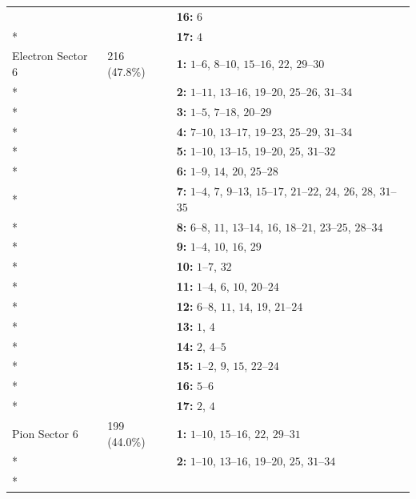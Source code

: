 \begin{longtable}{p{3.5cm}p{2.2cm}p{8.3cm}}
 &  & \textbf{16:} \mbox{$6$} \\*
 &  & \textbf{17:} \mbox{$4$} \\
\addlinespace
Electron Sector 6 & 216 (47.8\%) & \textbf{1:} \mbox{$1$--$6$}, \mbox{$8$--$10$}, \mbox{$15$--$16$}, \mbox{$22$}, \mbox{$29$--$30$} \\*
 &  & \textbf{2:} \mbox{$1$--$11$}, \mbox{$13$--$16$}, \mbox{$19$--$20$}, \mbox{$25$--$26$}, \mbox{$31$--$34$} \\*
 &  & \textbf{3:} \mbox{$1$--$5$}, \mbox{$7$--$18$}, \mbox{$20$--$29$} \\*
 &  & \textbf{4:} \mbox{$7$--$10$}, \mbox{$13$--$17$}, \mbox{$19$--$23$}, \mbox{$25$--$29$}, \mbox{$31$--$34$} \\*
 &  & \textbf{5:} \mbox{$1$--$10$}, \mbox{$13$--$15$}, \mbox{$19$--$20$}, \mbox{$25$}, \mbox{$31$--$32$} \\*
 &  & \textbf{6:} \mbox{$1$--$9$}, \mbox{$14$}, \mbox{$20$}, \mbox{$25$--$28$} \\*
 &  & \textbf{7:} \mbox{$1$--$4$}, \mbox{$7$}, \mbox{$9$--$13$}, \mbox{$15$--$17$}, \mbox{$21$--$22$}, \mbox{$24$}, \mbox{$26$}, \mbox{$28$}, \mbox{$31$--$35$} \\*
 &  & \textbf{8:} \mbox{$6$--$8$}, \mbox{$11$}, \mbox{$13$--$14$}, \mbox{$16$}, \mbox{$18$--$21$}, \mbox{$23$--$25$}, \mbox{$28$--$34$} \\*
 &  & \textbf{9:} \mbox{$1$--$4$}, \mbox{$10$}, \mbox{$16$}, \mbox{$29$} \\*
 &  & \textbf{10:} \mbox{$1$--$7$}, \mbox{$32$} \\*
 &  & \textbf{11:} \mbox{$1$--$4$}, \mbox{$6$}, \mbox{$10$}, \mbox{$20$--$24$} \\*
 &  & \textbf{12:} \mbox{$6$--$8$}, \mbox{$11$}, \mbox{$14$}, \mbox{$19$}, \mbox{$21$--$24$} \\*
 &  & \textbf{13:} \mbox{$1$}, \mbox{$4$} \\*
 &  & \textbf{14:} \mbox{$2$}, \mbox{$4$--$5$} \\*
 &  & \textbf{15:} \mbox{$1$--$2$}, \mbox{$9$}, \mbox{$15$}, \mbox{$22$--$24$} \\*
 &  & \textbf{16:} \mbox{$5$--$6$} \\*
 &  & \textbf{17:} \mbox{$2$}, \mbox{$4$} \\
\addlinespace
Pion Sector 6 & 199 (44.0\%) & \textbf{1:} \mbox{$1$--$10$}, \mbox{$15$--$16$}, \mbox{$22$}, \mbox{$29$--$31$} \\*
 &  & \textbf{2:} \mbox{$1$--$10$}, \mbox{$13$--$16$}, \mbox{$19$--$20$}, \mbox{$25$}, \mbox{$31$--$34$} \\*

\end{longtable}
